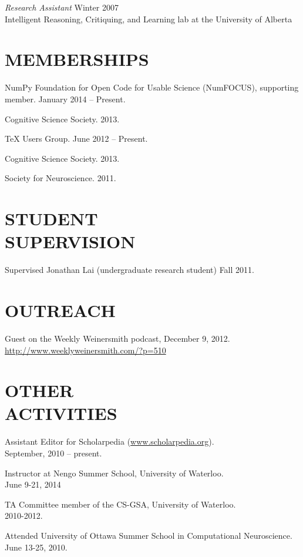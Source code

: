 \documentclass[line,margin]{res}
\begin{document}
\begin{resume}
{\sl Research Assistant} \hfill Winter 2007 \\
Intelligent Reasoning, Critiquing, and Learning lab at the University of Alberta

\section{MEMBERSHIPS}

NumPy Foundation for Open Code for Usable Science (NumFOCUS),
supporting member. January 2014 -- Present.

Cognitive Science Society. 2013.

TeX Users Group. June 2012 -- Present.

Cognitive Science Society. 2013.

Society for Neuroscience. 2011.

\section{STUDENT \\ SUPERVISION}

Supervised Jonathan Lai (undergraduate research student) Fall 2011.

\section{OUTREACH}

Guest on the Weekly Weinersmith podcast, December 9, 2012. \\
\url{http://www.weeklyweinersmith.com/?p=510}

\section{OTHER \\ ACTIVITIES}

Assistant Editor for Scholarpedia (\url{www.scholarpedia.org}). \\
September, 2010 -- present.

Instructor at Nengo Summer School, University of Waterloo. \\
June 9-21, 2014

TA Committee member of the CS-GSA, University of Waterloo. \\
2010-2012.

Attended University of Ottawa Summer School in Computational Neuroscience. \\
June 13-25, 2010. \vspace{8pt}


\end{resume}
\end{document}
